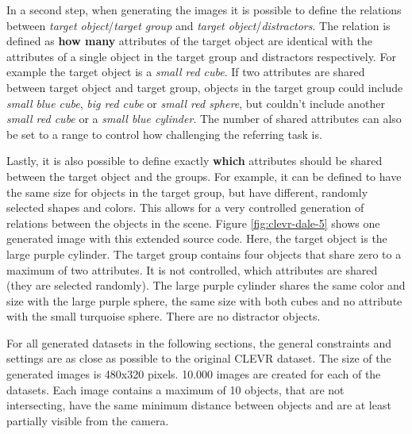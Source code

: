 In a second step, when generating the images it is possible to define the relations between \emph{target object}/\emph{target group} and \emph{target object}/\emph{distractors}.
The relation is defined as \textbf{how many} attributes of the target object are identical with the attributes of a single object in the target group and distractors respectively.
For example the target object is a \emph{small red cube}.
If two attributes are shared between target object and target group, objects in the target group could include \emph{small blue cube}, \emph{big red cube} or \emph{small red sphere}, but couldn't include another \emph{small red cube} or a \emph{small blue cylinder}.
The number of shared attributes can also be set to a range to control how challenging the referring task is.

Lastly, it is also possible to define exactly \textbf{which} attributes should be shared between the target object and the groups.
For example, it can be defined to have the same size for objects in the target group, but have different, randomly selected shapes and colors.
This allows for a very controlled generation of relations between the objects in the scene.
Figure \ref{fig:clevr-dale-5} shows one generated image with this extended source code.
Here, the target object is the large purple cylinder.
The target group contains four objects that share zero to a maximum of two attributes.
It is not controlled, which attributes are shared (they are selected randomly). The large purple cylinder shares the same color and size with the large purple sphere, the same size with both cubes and no attribute with the small turquoise sphere.
There are no distractor objects.

For all generated datasets in the following sections, the general constraints and settings are as close as possible to the original CLEVR dataset.
The size of the generated images is 480x320 pixels.
10.000 images are created for each of the datasets.
Each image contains a maximum of 10 objects, that are not intersecting, have the same minimum distance between objects and are at least partially visible from the camera.

